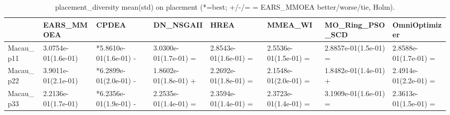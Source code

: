 \begin{table}[t]
\centering
\caption{placement_diversity mean(std) on placement (*=best; +/-/= = EARS_MMOEA better/worse/tie, Holm).}
\label{tab:placement_placement_diversity}
\begin{tabular}{llllllll}
\toprule
 & EARS\_MMOEA & CPDEA & DN\_NSGAII & HREA & MMEA\_WI & MO\_Ring\_PSO\_SCD & OmniOptimizer \\
\midrule
Macau\_p11 & 3.0754e-01(1.6e-01) & *5.8610e-01(1.6e-01) - & 3.0300e-01(1.7e-01) = & 2.8543e-01(1.6e-01) = & 2.5536e-01(1.5e-01) = & 2.8857e-01(1.5e-01) = & 2.8588e-01(1.7e-01) = \\
Macau\_p22 & 3.9011e-01(2.1e-01) & *6.2899e-01(2.0e-01) - & 1.8602e-01(1.8e-01) + & 2.2692e-01(1.8e-01) = & 2.1548e-01(2.0e-01) = & 1.8482e-01(1.4e-01) + & 2.4914e-01(2.2e-01) = \\
Macau\_p33 & 2.2136e-01(1.7e-01) & *6.2356e-01(1.9e-01) - & 2.2535e-01(1.4e-01) = & 2.3594e-01(1.4e-01) = & 2.3723e-01(1.4e-01) = & 3.1909e-01(1.6e-01) = & 2.3613e-01(1.5e-01) = \\
\bottomrule
\end{tabular}
\end{table}
